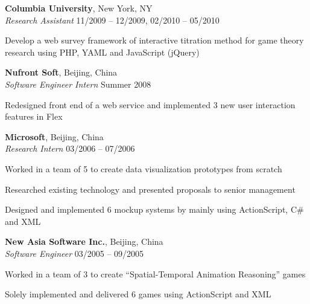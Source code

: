 \documentclass[margin,line]{resume}
\begin{document}
\begin{resume}
    \textbf{Columbia University}, New York, NY \\
    \textsl{Research Assistant} \hfill 11/2009 -- 12/2009, 02/2010 -- 05/2010 \vspace{-3mm}\\\vspace{-1mm}%
      \begin{list2} 
      \item Develop a web survey framework of interactive titration method for game theory research using PHP, YAML and JavaScript (jQuery)
      \end{list2}

    \textbf{Nufront Soft}, Beijing, China \\
    \textsl{Software Engineer Intern} \hfill Summer 2008 \vspace{-3mm}\\\vspace{-1mm}%
      \begin{list2}
      \item Redesigned front end of a web service and implemented 3 new user interaction features in Flex 
      \end{list2}

    \textbf{Microsoft}, Beijing, China \\
    \textsl{Research Intern} \hfill 03/2006 -- 07/2006 \vspace{-3mm}\\\vspace{-1mm}%
      \begin{list2}
      \item Worked in a team of 5 to create data visualization prototypes from scratch 
      \item Researched existing technology and presented proposals to senior management 
      \item Designed and implemented 6 mockup systems by mainly using ActionScript, C\# and XML 
      \end{list2}
   
    \textbf{New Asia Software Inc.}, Beijing, China \\
    \textsl{Software Engineer} \hfill 03/2005 -- 09/2005  \vspace{-3mm}\\\vspace{-1mm}%
     \begin{list2}
      \item Worked in a team of 3 to create “Spatial-Temporal Animation Reasoning” games
      \item Solely implemented and delivered 6 games using ActionScript and XML      
     \end{list2}



\end{resume}
\end{document}
